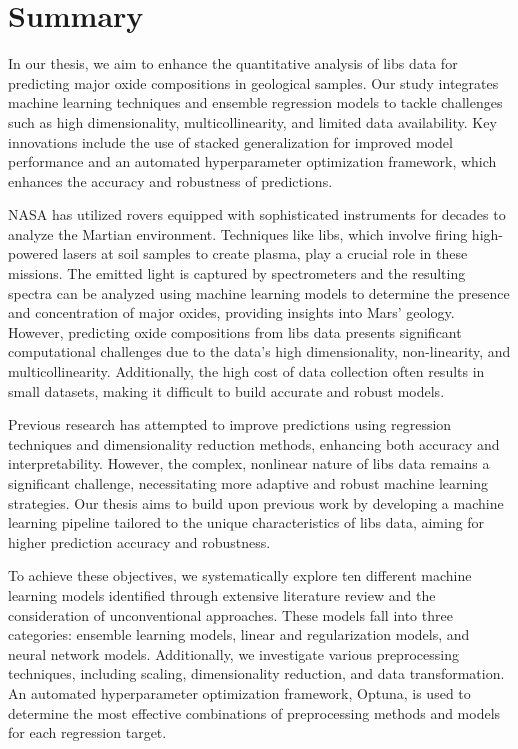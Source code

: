 \section*{Summary}
In our thesis, we aim to enhance the quantitative analysis of \gls{libs} data for predicting major oxide compositions in geological samples.
Our study integrates machine learning techniques and ensemble regression models to tackle challenges such as high dimensionality, multicollinearity, and limited data availability.
Key innovations include the use of stacked generalization for improved model performance and an automated hyperparameter optimization framework, which enhances the accuracy and robustness of predictions.

\vspace{0.5em}

NASA has utilized rovers equipped with sophisticated instruments for decades to analyze the Martian environment.
Techniques like \gls{libs}, which involve firing high-powered lasers at soil samples to create plasma, play a crucial role in these missions.
The emitted light is captured by spectrometers and the resulting spectra can be analyzed using machine learning models to determine the presence and concentration of major oxides, providing insights into Mars' geology.
However, predicting oxide compositions from \gls{libs} data presents significant computational challenges due to the data's high dimensionality, non-linearity, and multicollinearity.
Additionally, the high cost of data collection often results in small datasets, making it difficult to build accurate and robust models.

\vspace{0.5em}

Previous research has attempted to improve predictions using regression techniques and dimensionality reduction methods, enhancing both accuracy and interpretability.
However, the complex, nonlinear nature of \gls{libs} data remains a significant challenge, necessitating more adaptive and robust machine learning strategies.
Our thesis aims to build upon previous work by developing a machine learning pipeline tailored to the unique characteristics of \gls{libs} data, aiming for higher prediction accuracy and robustness.

\vspace{0.5em}

To achieve these objectives, we systematically explore ten different machine learning models identified through extensive literature review and the consideration of unconventional approaches.
These models fall into three categories: ensemble learning models, linear and regularization models, and neural network models.
Additionally, we investigate various preprocessing techniques, including scaling, dimensionality reduction, and data transformation.
An automated hyperparameter optimization framework, Optuna, is used to determine the most effective combinations of preprocessing methods and models for each regression target.

